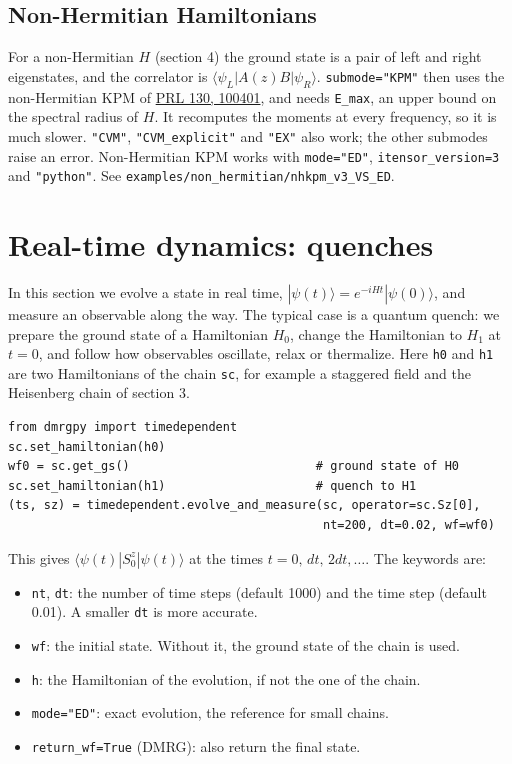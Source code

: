 \documentclass[11pt]{article}
\providecommand{\tightlist}{\setlength{\itemsep}{0pt}\setlength{\parskip}{0pt}}
\begin{document}
\subsection{Non-Hermitian Hamiltonians}

For a non-Hermitian \(H\) (section 4) the ground state is a pair of left and
right eigenstates, and the correlator is
\(\langle\psi_L|A(z)B|\psi_R\rangle\). \texttt{submode="KPM"} then uses the
non-Hermitian KPM of \href{https://doi.org/10.1103/PhysRevLett.130.100401}{PRL 130, 100401},
and needs \texttt{E\_\allowbreak{}max}, an upper bound on the spectral radius of \(H\). It
recomputes the moments at every frequency, so it is much slower. \texttt{"CVM"},
\texttt{"CVM\_\allowbreak{}explicit"} and \texttt{"EX"} also work; the other submodes raise an error.
Non-Hermitian KPM works with \texttt{mode="ED"}, \texttt{itensor\_\allowbreak{}version=3} and
\texttt{"python"}. See \texttt{examples/non\_\allowbreak{}hermitian/nhkpm\_\allowbreak{}v3\_\allowbreak{}VS\_\allowbreak{}ED}.

\section{Real-time dynamics: quenches}

In this section we evolve a state in real time,
\(|\psi(t)\rangle=e^{-iHt}|\psi(0)\rangle\), and measure an observable along
the way. The typical case is a quantum quench: we prepare the ground state
of a Hamiltonian \(H_0\), change the Hamiltonian to \(H_1\) at \(t=0\), and follow
how observables oscillate, relax or thermalize. Here \texttt{h0} and \texttt{h1} are two
Hamiltonians of the chain \texttt{sc}, for example a staggered field and the
Heisenberg chain of section 3.

\begin{lstlisting}
from dmrgpy import timedependent
sc.set_hamiltonian(h0)
wf0 = sc.get_gs()                          # ground state of H0
sc.set_hamiltonian(h1)                     # quench to H1
(ts, sz) = timedependent.evolve_and_measure(sc, operator=sc.Sz[0],
                                            nt=200, dt=0.02, wf=wf0)
\end{lstlisting}

This gives \(\langle\psi(t)|S^z_0|\psi(t)\rangle\) at the times
\(t=0,\,dt,\,2dt,\dots\). The keywords are:

\begin{itemize}
\tightlist
\item
  \texttt{nt}, \texttt{dt}: the number of time steps (default 1000) and the time step
  (default 0.01). A smaller \texttt{dt} is more accurate.
\item
  \texttt{wf}: the initial state. Without it, the ground state of the chain is
  used.
\item
  \texttt{h}: the Hamiltonian of the evolution, if not the one of the chain.
\item
  \texttt{mode="ED"}: exact evolution, the reference for small chains.
\item
  \texttt{return\_\allowbreak{}wf=True} (DMRG): also return the final state.
\end{itemize}
\end{document}
